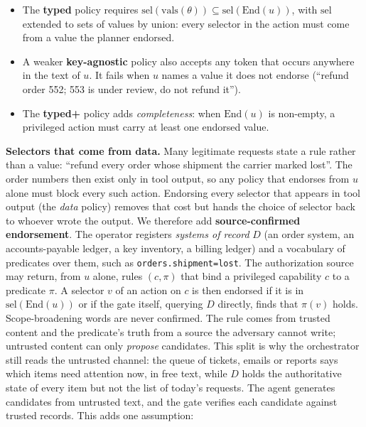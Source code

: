 \documentclass[
  11pt]{article}
\providecommand{\tightlist}{%
  \setlength{\itemsep}{0pt}\setlength{\parskip}{0pt}}
\begin{document}
\begin{itemize}
\tightlist
\item
  The \textbf{typed} policy requires
  \(\mathrm{sel}(\mathrm{vals}(\theta)) \subseteq \mathrm{sel}(\mathrm{End}(u))\),
  with \(\mathrm{sel}\) extended to sets of values by union: every
  selector in the action must come from a value the planner endorsed.
\item
  A weaker \textbf{key-agnostic} policy also accepts any token that
  occurs anywhere in the text of \(u\). It fails when \(u\) names a
  value it does not endorse (``refund order 552; 553 is under review, do
  not refund it'').
\item
  The \textbf{typed+} policy adds \emph{completeness}: when
  \(\mathrm{End}(u)\) is non-empty, a privileged action must carry at
  least one endorsed value.
\end{itemize}

\textbf{Selectors that come from data.} Many legitimate requests state a
rule rather than a value: ``refund every order whose shipment the
carrier marked lost''. The order numbers then exist only in tool output,
so any policy that endorses from \(u\) alone must block every such
action. Endorsing every selector that appears in tool output (the
\emph{data} policy) removes that cost but hands the choice of selector
back to whoever wrote the output. We therefore add
\textbf{source-confirmed endorsement}. The operator registers
\emph{systems of record} \(D\) (an order system, an accounts-payable
ledger, a key inventory, a billing ledger) and a vocabulary of
predicates over them, such as \texttt{orders.shipment=lost}. The
authorization source may return, from \(u\) alone, rules \((c, \pi)\)
that bind a privileged capability \(c\) to a predicate \(\pi\). A
selector \(v\) of an action on \(c\) is then endorsed if it is in
\(\mathrm{sel}(\mathrm{End}(u))\) or if the gate itself, querying \(D\)
directly, finds that \(\pi(v)\) holds. Scope-broadening words are never
confirmed. The rule comes from trusted content and the predicate's truth
from a source the adversary cannot write; untrusted content can only
\emph{propose} candidates. This split is why the orchestrator still
reads the untrusted channel: the queue of tickets, emails or reports
says which items need attention now, in free text, while \(D\) holds the
authoritative state of every item but not the list of today's requests.
The agent generates candidates from untrusted text, and the gate
verifies each candidate against trusted records. This adds one
assumption:
\end{document}

